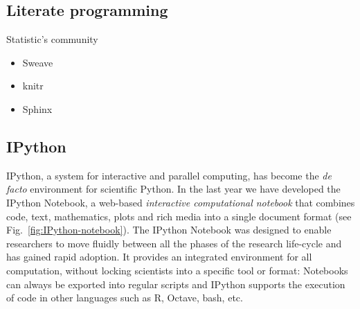 \documentclass[ChapterTOCs,krantz2]{krantz} %
\begin{document}
\subsection{Literate programming}

Statistic's community
\begin{itemize}
\item Sweave
\item knitr
\item Sphinx
\end{itemize}

\subsection{IPython}


IPython, a system for interactive and parallel computing, has become
the\emph{ de facto} environment for scientific Python. In
the last year we have developed the IPython Notebook, a web-based\emph{
interactive computational notebook} that combines code, text, mathematics,
plots and rich media into a single document format (see Fig.~\ref{fig:IPython-notebook}).
The IPython Notebook was designed to enable researchers to move fluidly
between all the phases of the research life-cycle and has gained rapid
adoption. It provides an integrated environment for all computation,
without locking scientists into a specific tool or format: Notebooks
can always be exported into regular scripts and IPython supports the
execution of code in other languages such as R, Octave, bash, etc.
\end{document}
